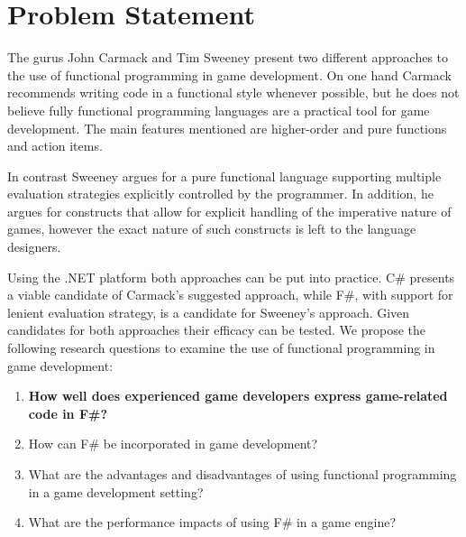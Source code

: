 \section{Problem Statement} \label{sec:problem_statement}
The gurus John Carmack and Tim Sweeney present two different approaches to the use of functional programming in game development. On one hand Carmack recommends writing code in a functional style whenever possible, but he does not believe fully functional programming languages are a practical tool for game development. The main features mentioned are higher-order and pure functions and action items.

In contrast Sweeney argues for a pure functional language supporting multiple evaluation strategies explicitly controlled by the programmer. In addition, he argues for constructs that allow for explicit handling of the imperative nature of games, however the exact nature of such constructs is left to the language designers.

Using the .NET platform both approaches can be put into practice. C\# presents a viable candidate of Carmack's suggested approach, while F\#, with support for lenient evaluation strategy, is a candidate for Sweeney's approach. Given candidates for both approaches their efficacy can be tested. We propose the following research questions to examine the use of functional programming in game development:

\begin{center}
    \begin{enumerate}
        \item \textbf{How well does experienced game developers express game-related code in F\#?}
        \item How can F\# be incorporated in game development?
        \item What are the advantages and disadvantages of using functional programming in a game development setting?
        \item What are the performance impacts of using F\# in a game engine?
    \end{enumerate}
\end{center}